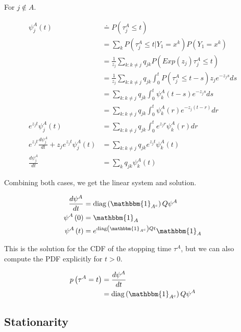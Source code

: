 For $j \not\in A$.

\begin{align}
\psi_j^A\left(t\right) &\doteq P\left(\tau^A_j \leq t\right) \\
                       &= \sum_k P\left(\tau^A_j \leq t | Y_1 = x^k\right) P\left(Y_1 = x^k\right) \\ 
                       &= \frac{1}{z_j}\sum_{k: k \neq j} q_{jk} P\left(Exp\left(z_j\right)\tau^A_j \leq t\right)  \\
                       &= \frac{1}{z_j}\sum_{k: k \neq j} q_{jk} \int^t_0 P\left(\tau^A_j \leq t - s\right) z_j e^{-z_j s} ds  \\
                       &= \sum_{k: k \neq j} q_{jk} \int^t_0\psi^A_k\left(t-s\right)e^{-z_j s} ds  \\
                       &= \sum_{k: k \neq j} q_{jk} \int^t_0\psi^A_k\left(r\right)e^{-z_j\left(t-r\right)} dr  \\
e^{z_jt}\psi^A_j\left(t\right) &= \sum_{k: k \neq j} q_{jk} \int^t_0 e^{z_jr}\psi^A_k\left(r\right) dr  \\
e^{z_jt}\frac{d\psi^A_j}{dt} + z_j e^{z_j t} \psi^A_j\left(t\right) &= \sum_{k: k \neq j} q_{jk} e^{z_jt}\psi^A_k\left(t\right)  \\
\frac{d\psi^A_j}{dt} &= \sum_{k} q_{jk} \psi^A_k\left(t\right) 
\end{align}

Combining both cases, we get the linear system and solution.

\begin{align}
        \frac{d\psi^A}{dt} &= \diag\left(\mathbbm{1}_{A^c}\right)Q\psi^A \\
        \psi^A\left(0\right) &= \mathbbm{1}_{A} \\
        \psi^A\left(t\right) &= e^{\diag\left(\mathbbm{1}_{A^c}\right)Qt} \mathbbm{1}_{A} \\ 
\end{align}

This is the solution for the CDF of the stopping time $\tau^A$, but we can also compute the PDF explicitly for $t > 0$.

\begin{align}
        p\left(\tau^A = t\right) &= \frac{d\psi^A}{dt} \\
        &= \diag\left(\mathbbm{1}_{A^c}\right)Q\psi^A
\end{align} 



\subsection{Stationarity}

